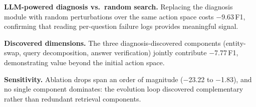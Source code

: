   \noindent \textbf{LLM-powered diagnosis vs.\ random search.} Replacing the diagnosis module with random perturbations over 
  the same action space costs $-$9.63\,F1, confirming that reading per-question failure logs provides meaningful
  signal.    

  \noindent \textbf{Discovered dimensions.} The three diagnosis-discovered components (entity-swap, query
  decomposition, answer verification) jointly contribute $-$7.77\,F1, demonstrating value beyond the initial action
  space.

  \noindent \textbf{Sensitivity.} Ablation drops span an order of magnitude ($-$23.22 to $-$1.83), and no single component dominates: the evolution loop discovered complementary rather than redundant retrieval components.



